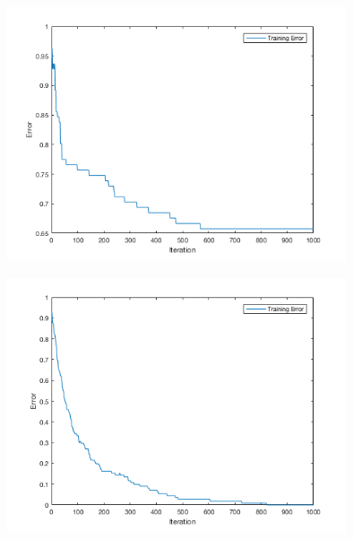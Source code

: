 \documentclass[12pt]{article}
\begin{document}
\begin{center}
  \begin{table}[H]
    \begin{varwidth}[b]{0.4\linewidth}
      \centering
      \label{table:YYNYN}
    \end{varwidth}%
    \hfill
    \begin{minipage}[b]{0.6\linewidth}
      \centering
      \includegraphics[width=100mm]{YYNYN_training_error.png}
      \label{fig:YYNYN}
    \end{minipage}
  \end{table}
\end{center}




\begin{center}
  \begin{table}[H]
    \begin{varwidth}[b]{0.4\linewidth}
      \centering
      \label{table:YNYYN}
    \end{varwidth}%
    \hfill
    \begin{minipage}[b]{0.6\linewidth}
      \centering
      \includegraphics[width=100mm]{YNYYN_training_error.png}
      \label{fig:YNYYN}
    \end{minipage}
  \end{table}
\end{center}
\end{document}
